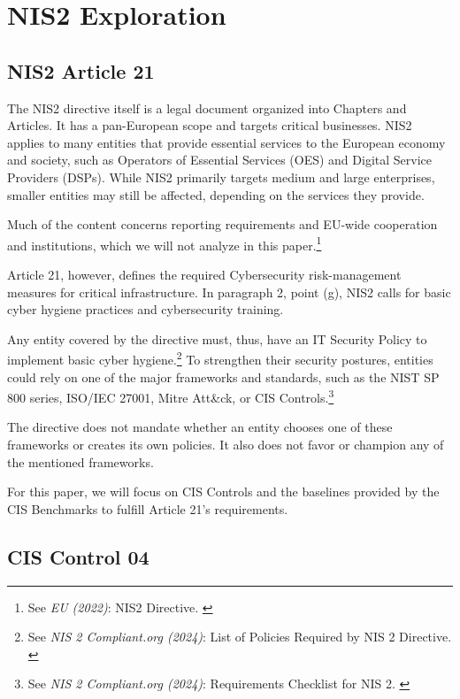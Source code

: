 %
%

\pagebreak
\section{NIS2 Exploration}

\onehalfspacing

\subsection{NIS2 Article 21}

The NIS2 directive itself is a legal document organized into Chapters and Articles. It has a pan-European scope and targets critical businesses. NIS2 applies to many entities that provide essential services to the European economy and society, such as Operators of Essential Services (OES) and Digital Service Providers (DSPs). While NIS2 primarily targets medium and large enterprises, smaller entities may still be affected, depending on the services they provide.

Much of the content concerns reporting requirements and EU-wide cooperation and institutions, which we will not analyze in this paper.\footnote{See \textit{EU (2022)}: NIS2 Directive. \cite{nis2}}

Article 21, however, defines the required Cybersecurity risk-management measures for critical infrastructure. In paragraph 2, point (g), NIS2 calls for basic cyber hygiene practices and cybersecurity training.

Any entity covered by the directive must, thus, have an IT Security Policy to implement basic cyber hygiene.\footnote{See \textit{NIS 2 Compliant.org (2024)}: List of Policies Required by NIS 2 Directive. \cite{nisPols}} To strengthen their security postures, entities could rely on one of the major frameworks and standards, such as the NIST SP 800 series, ISO/IEC 27001, Mitre Att\&ck, or CIS Controls.\footnote{See \textit{NIS 2 Compliant.org (2024)}: Requirements Checklist for NIS 2. \cite{nisReqs}}

The directive does not mandate whether an entity chooses one of these frameworks or creates its own policies. It also does not favor or champion any of the mentioned frameworks.

For this paper, we will focus on CIS Controls and the baselines provided by the CIS Benchmarks to fulfill Article 21's requirements.

\subsection{CIS Control 04}

